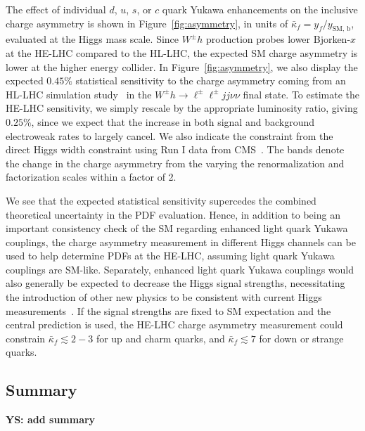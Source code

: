 \documentclass[../report.tex]{subfiles}
\begin{document}
The effect of individual $d$, $u$, $s$, or $c$ quark Yukawa
enhancements on the inclusive charge asymmetry is shown in
Figure~\ref{fig:asymmetry}, in units of $\bar{\kappa}_f = y_f /
y_{\text{SM, b}}$, evaluated at the Higgs mass scale.  Since $W^\pm h$
production probes lower Bjorken-$x$ at the HE-LHC compared to the
HL-LHC, the expected SM charge asymmetry is lower at the higher energy
collider.  In Figure~\ref{fig:asymmetry}, we also display the expected
$0.45\%$ statistical sensitivity to the charge asymmetry coming from
an HL-LHC simulation study~\cite{Yu:2016rvv} in the $W^\pm h \to
\ell^\pm \ell^\pm jj \nu \nu$ final state.  To estimate the HE-LHC
sensitivity, we simply rescale by the appropriate luminosity ratio,
giving $0.25\%$, since we expect that the increase in both signal and
background electroweak rates to largely cancel.  We also indicate the
constraint from the direct Higgs width constraint using Run I data
from CMS~\cite{Yu:2016rvv}.  The bands denote the change in the charge
asymmetry from the varying the renormalization and factorization
scales within a factor of 2.

We see that the expected statistical sensitivity supercedes the
combined theoretical uncertainty in the PDF evaluation.  Hence, in
addition to being an important consistency check of the SM regarding
enhanced light quark Yukawa couplings, the charge asymmetry
measurement in different Higgs channels can be used to help determine
PDFs at the HE-LHC, assuming light quark Yukawa couplings are SM-like.
Separately, enhanced light quark Yukawa couplings would also generally
be expected to decrease the Higgs signal strengths, necessitating the
introduction of other new physics to be consistent with current Higgs
measurements~\cite{Yu:2016rvv}.  If the signal strengths are fixed to
SM expectation and the central prediction is used, the HE-LHC charge
asymmetry measurement could constrain $\bar{\kappa}_f \lesssim 2-3$
for up and charm quarks, and $\bar{\kappa}_f \lesssim 7$ for down or
strange quarks.





\subsection{Summary}

{\bf YS: add summary }
\end{document}
